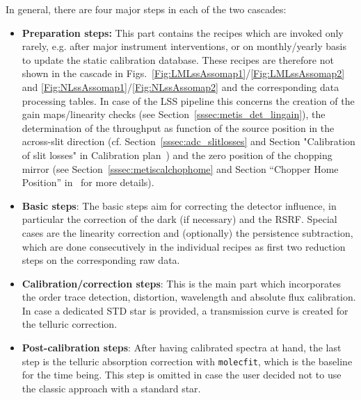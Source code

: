 In general, there are four major steps in each of the two cascades:
\begin{itemize}
    \item \textbf{Preparation steps:} This part contains the recipes which are invoked only rarely, e.g. after major instrument interventions, or on monthly/yearly basis to update the static calibration database. These recipes are therefore not shown in the cascade in Figs.~\ref{Fig:LMLssAssomap1}/\ref{Fig:LMLssAssomap2} and \ref{Fig:NLssAssomap1}/\ref{Fig:NLssAssomap2} and the corresponding data processing tables. In case of the \ac{LSS} pipeline this concerns the creation of the gain maps/linearity checks (see Section~\ref{sssec:metis_det_lingain}), the determination of the throughput as function of the source position in the across-slit direction (cf. Section~\ref{sssec:adc_slitlosses} and Section "Calibration of slit losses" in Calibration plan~\cite{METIS-calibration_plan}) and the zero position of the chopping mirror (see Section~\ref{sssec:metiscalchophome} and Section ``Chopper Home Position'' in~\cite{METIS-calibration_plan} for more details).
    \item \textbf{Basic steps}: The basic steps aim for correcting the detector influence, in particular the correction of the dark (if necessary) and the \ac{RSRF}. Special cases are the linearity correction and (optionally) the persistence subtraction, which are done consecutively in the individual recipes as first two reduction steps on the corresponding raw data. %
    \item \textbf{Calibration/correction steps}: This is the main part which incorporates the order trace detection, distortion, wavelength and absolute flux calibration. In case a dedicated \ac{STD} star is provided, a transmission curve is created for the telluric correction.
    \item \textbf{Post-calibration steps}: After having calibrated spectra at hand, the last step is the telluric absorption correction with \texttt{molecfit}, which is the baseline for the time being. This step is omitted in case the user decided not to use the classic approach with a standard star.
\end{itemize}

